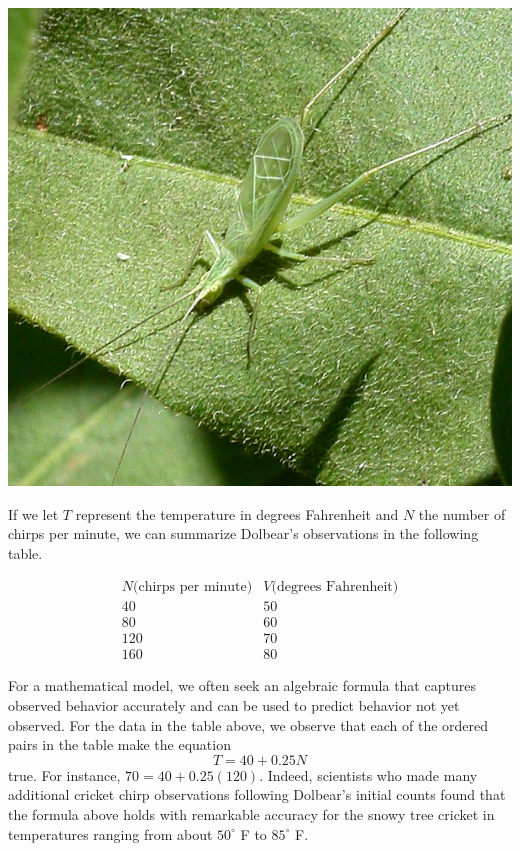 \documentclass{ximera}
\begin{document}
\begin{image}
\includegraphics{CompositionText3.jpg}
\end{image}

If we let $T$ represent the temperature in degrees Fahrenheit and $N$ the number of chirps per minute, we can summarize Dolbear's observations in the following table.

$$
\begin{array}{cc}
N \text{(chirps per minute)} & V \text{(degrees Fahrenheit)}\\
\hline
40&50\\
80&60\\
120&70\\
160&80
\end{array}
$$

For a mathematical model, we often seek an algebraic formula that captures observed behavior accurately and can be used to predict behavior not yet observed.  For the data in the table above, we observe that each of the ordered pairs in the table make the equation%
\begin{equation}
T = 40 + 0.25N
\end{equation}
true.  For instance, $70 = 40 + 0.25(120)$.  Indeed, scientists who made many additional cricket chirp observations following Dolbear's initial counts found that the formula above holds with remarkable accuracy for the snowy tree cricket in temperatures ranging from about $50^\circ$ F to $85^\circ$ F.
\end{document}
